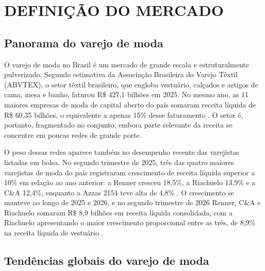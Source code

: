 %

\section{DEFINIÇÃO DO MERCADO}
\label{sec:mercado}
\nocite{startse2023autoatendimento} %

\subsection{Panorama do varejo de moda}
\label{subsec:panorama}

O varejo de moda no Brasil é um mercado de grande escala e estruturalmente pulverizado. Segundo estimativa da Associação Brasileira do Varejo Têxtil (ABVTEX), o setor têxtil brasileiro, que engloba vestuário, calçados e artigos de cama, mesa e banho, faturou R\$ 427,1 bilhões em 2025. No mesmo ano, as 11 maiores empresas de moda de capital aberto do país somaram receita líquida de R\$ 60,35 bilhões, o equivalente a apenas 15\% desse faturamento \cite{gbljeans2026maiores}. O setor é, portanto, fragmentado no conjunto, embora parte relevante da receita se concentre em poucas redes de grande porte.

O peso dessas redes aparece também no desempenho recente das varejistas listadas em bolsa. No segundo trimestre de 2025, três das quatro maiores varejistas de moda do país registraram crescimento de receita líquida superior a 10\% em relação ao ano anterior: a Renner cresceu 18,5\%, a Riachuelo 13,9\% e a C\&A 12,4\%, enquanto a Azzas 2154 teve alta de 4,8\% \cite{timesbrasil2025varejistas}. O crescimento se manteve ao longo de 2025 e 2026, e no segundo trimestre de 2026 Renner, C\&A e Riachuelo somaram R\$ 8,9 bilhões em receita líquida consolidada, com a Riachuelo apresentando o maior crescimento proporcional entre as três, de 8,9\% na receita líquida de vestuário \cite{gbljeans2026trimestre}.

\subsection{Tendências globais do varejo de moda}
\label{subsec:tendencias}

